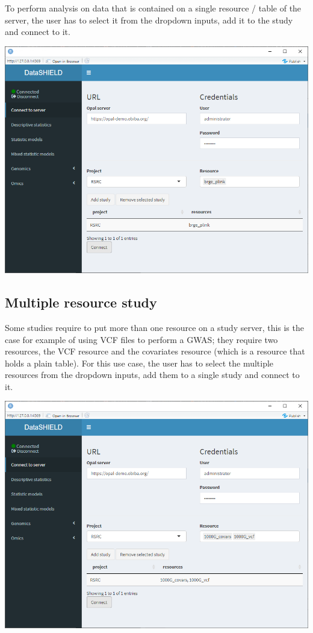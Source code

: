 \documentclass[
]{book}
\begin{document}
To perform analysis on data that is contained on a single resource / table of the server, the user has to select it from the dropdown inputs, add it to the study and connect to it.

\includegraphics{images/data_entry1.png}

\hypertarget{multiple-resource-study}{%
\subsection{Multiple resource study}\label{multiple-resource-study}}

Some studies require to put more than one resource on a study server, this is the case for example of using VCF files to perform a GWAS; they require two resources, the VCF resource and the covariates resource (which is a resource that holds a plain table). For this use case, the user has to select the multiple resources from the dropdown inputs, add them to a single study and connect to it.

\includegraphics{images/data_entry2.png}
\end{document}
